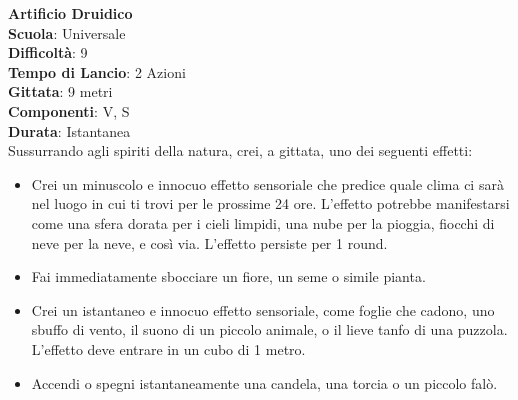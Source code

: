\begin{multicols}{2}
\medskip\textbf{Artificio Druidico}\\
\textbf{Scuola}: Universale\\
\textbf{Difficoltà}:  9\\
\textbf{Tempo di Lancio}: 2 Azioni\\
\textbf{Gittata}: 9 metri\\
\textbf{Componenti}: V, S\\
\textbf{Durata}: Istantanea\\
Sussurrando agli spiriti della natura, crei, a gittata, uno dei seguenti effetti:
\begin{itemize}
\item
Crei un minuscolo e innocuo effetto sensoriale che predice quale clima ci sarà nel luogo in cui ti trovi per le prossime 24 ore. L’effetto potrebbe manifestarsi come una sfera dorata per i cieli limpidi, una nube per la pioggia, fiocchi di neve per la neve, e così via. L’effetto persiste per 1 round.
\item 
Fai immediatamente sbocciare un fiore, un seme o simile pianta.
\item 
Crei un istantaneo e innocuo effetto sensoriale, come foglie che cadono, uno sbuffo di vento, il suono di un piccolo animale, o il lieve tanfo di una puzzola. L’effetto deve entrare in un cubo di 1 metro.
\item Accendi o spegni istantaneamente una candela, una torcia o un piccolo falò.
\end{itemize}


\end{multicols}
